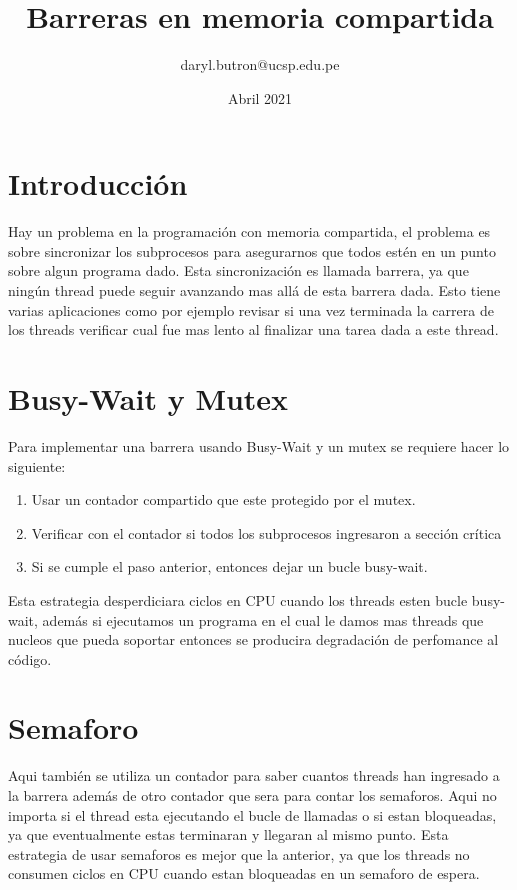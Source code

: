 \documentclass[11pt]{article}
\title{Barreras en memoria compartida}
\author{daryl.butron@ucsp.edu.pe}
\date{Abril 2021}
\begin{document}
    \maketitle

    \section{Introducción}
    Hay un problema en la programación con memoria compartida,
    el problema es sobre sincronizar los subprocesos para asegurarnos
    que todos estén en un punto sobre algun programa dado.
    Esta sincronización es llamada barrera, ya que ningún thread
    puede seguir avanzando mas allá de esta barrera dada. Esto tiene
    varias aplicaciones como por ejemplo revisar si una vez terminada
    la carrera de los threads verificar cual fue mas lento al finalizar
    una tarea dada a este thread.


    \section{Busy-Wait y Mutex}
    Para implementar una barrera usando Busy-Wait y un mutex
    se requiere hacer lo siguiente:
    \begin{enumerate}
        \item Usar un contador compartido que este protegido por el mutex.
        \item Verificar con el contador si todos los subprocesos ingresaron a sección crítica
        \item Si se cumple el paso anterior, entonces dejar un bucle busy-wait.
    \end{enumerate}
    Esta estrategia desperdiciara ciclos en CPU cuando los
    threads esten bucle busy-wait, además si ejecutamos un programa
    en el cual le damos mas threads que nucleos que pueda soportar
    entonces se producira degradación de perfomance al código.

    \section{Semaforo}
    Aqui también se utiliza un contador para saber
    cuantos threads han ingresado a la barrera además de otro
    contador que sera para contar los semaforos.
    Aqui no importa si el thread esta ejecutando el bucle
    de llamadas o si estan bloqueadas, ya que eventualmente
    estas terminaran y llegaran al mismo punto.
    Esta estrategia de usar semaforos es mejor que la anterior,
    ya que los threads no consumen ciclos en CPU cuando estan
    bloqueadas en un semaforo de espera.
\end{document}
